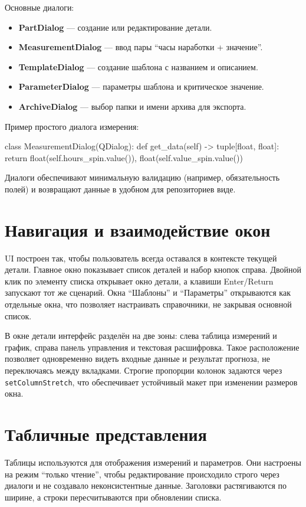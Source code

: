 \documentclass[12pt,a4paper]{article}
\begin{document}
Основные диалоги:
\begin{itemize}
  \item \textbf{PartDialog} --- создание или редактирование детали.
  \item \textbf{MeasurementDialog} --- ввод пары ``часы наработки + значение''.
  \item \textbf{TemplateDialog} --- создание шаблона с названием и описанием.
  \item \textbf{ParameterDialog} --- параметры шаблона и критическое значение.
  \item \textbf{ArchiveDialog} --- выбор папки и имени архива для экспорта.
\end{itemize}

Пример простого диалога измерения:
\begin{codeblock}
class MeasurementDialog(QDialog):
    def get_data(self) -> tuple[float, float]:
        return float(self.hours_spin.value()), float(self.value_spin.value())
\end{codeblock}
Диалоги обеспечивают минимальную валидацию (например, обязательность полей)
и возвращают данные в удобном для репозиториев виде.

\section*{Навигация и взаимодействие окон}
UI построен так, чтобы пользователь всегда оставался в контексте текущей детали.
Главное окно показывает список деталей и набор кнопок справа. Двойной клик по
элементу списка открывает окно детали, а клавиши Enter/Return запускают тот же сценарий.
Окна ``Шаблоны'' и ``Параметры'' открываются как отдельные окна, что позволяет
настраивать справочники, не закрывая основной список.

В окне детали интерфейс разделён на две зоны: слева таблица измерений и график,
справа панель управления и текстовая расшифровка. Такое расположение позволяет
одновременно видеть входные данные и результат прогноза, не переключаясь между вкладками.
Строгие пропорции колонок задаются через \texttt{setColumnStretch}, что обеспечивает
устойчивый макет при изменении размеров окна.

\section*{Табличные представления}
Таблицы используются для отображения измерений и параметров. Они настроены на режим
``только чтение'', чтобы редактирование происходило строго через диалоги и не
создавало неконсистентные данные. Заголовки растягиваются по ширине, а строки
пересчитываются при обновлении списка.
\end{document}

